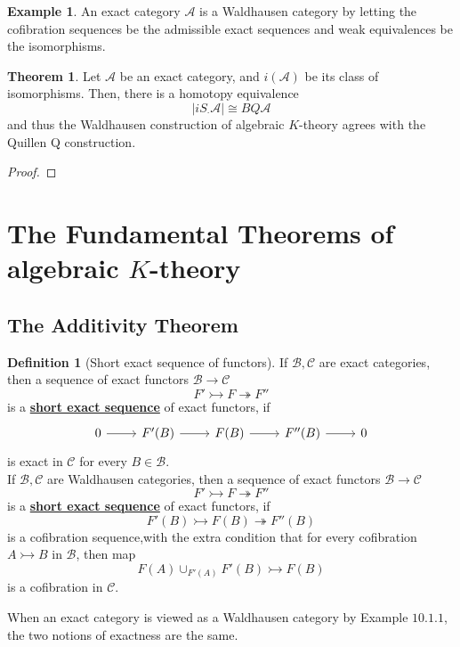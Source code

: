 \documentclass{article}
\theoremstyle{definition}
\newtheorem{theorem}{Theorem}[section]
\theoremstyle{definition}
\newtheorem{definition}{Definition}[theorem]
\theoremstyle{definition}
\theoremstyle{definition}
\theoremstyle{definition}
\theoremstyle{definition}
\theoremstyle{definition}
\newtheorem{example}{Example}[theorem]
\begin{document}
\begin{tcolorbox}[colback=yellow!5!white,colframe=yellow!30!white]
\begin{example}
An exact category $\mathcal{A}$ is a Waldhausen category by letting the cofibration sequences be the admissible exact sequences and weak equivalences be the isomorphisms. 
\end{example}
\end{tcolorbox}


\begin{tcolorbox}[colback=red!5!white,colframe=red!30!white]
\begin{theorem}
Let $\mathcal{A}$ be an exact category, and $i(\mathcal{A})$ be its class of isomorphisms. Then, there is a homotopy equivalence 
\[|iS_{\cdot} \mathcal{A}|\cong BQ \mathcal{A}\]
and thus the Waldhausen construction of algebraic $K$-theory agrees with the Quillen Q construction. 
\end{theorem}
\end{tcolorbox}
\begin{proof}
    
\end{proof}



\section{The Fundamental Theorems of algebraic $K$-theory}

\subsection{The Additivity Theorem}


\begin{tcolorbox}[colback=purple!5!white,colframe=purple!75!black]
\begin{definition}[Short exact sequence of functors]
If $\mathcal{B}, \mathcal{C}$ are exact categories, then a sequence of exact functors $\mathcal{B}\to \mathcal{C}$
\[F'\rightarrowtail F \twoheadrightarrow F''\]
is a \underline{\textbf{short exact sequence}} of exact functors, if 
\[\begin{tikzcd}
0\arrow[r]&F'(B)\arrow[r]&F(B)\arrow[r]&F''(B)\arrow[r]&0
\end{tikzcd}\]
is exact in $\mathcal{C}$ for every $B\in \mathcal{B}$.\\


If $\mathcal{B}, \mathcal{C}$ are Waldhausen categories, then a sequence of exact functors $\mathcal{B}\to \mathcal{C}$
\[F'\rightarrowtail F \twoheadrightarrow F''\]
is a \underline{\textbf{short exact sequence}} of exact functors, if 
\[F'(B)\rightarrowtail F(B)\twoheadrightarrow F''(B)\]
is a cofibration sequence,with the extra condition that for every cofibration $A\rightarrowtail B$ in $\mathcal{B}$, then map 
\[F(A)\cup_{F'(A)}F'(B)\rightarrowtail F(B)\]
is a cofibration in $\mathcal{C}$.
\end{definition}
\end{tcolorbox}
When an exact category is viewed as a Waldhausen category by Example $10.1.1$, the two notions of exactness are the same. 
\end{document}
